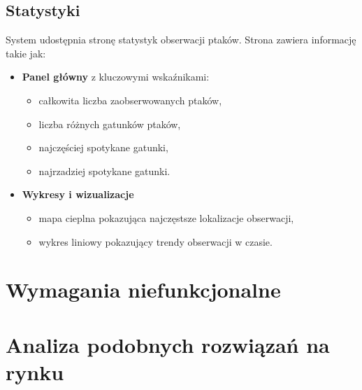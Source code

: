 \subsection{Statystyki}
System udostępnia stronę statystyk obserwacji ptaków. Strona zawiera informację takie jak:
\begin{itemize}
	\item \textbf{Panel główny} z kluczowymi wskaźnikami:
		\begin{itemize}
			\item całkowita liczba zaobserwowanych ptaków,
			\item liczba różnych gatunków ptaków,
			\item najczęściej spotykane gatunki,
			\item najrzadziej spotykane gatunki.
		\end{itemize}
	\item \textbf{Wykresy i wizualizacje}
		\begin{itemize}
			\item mapa cieplna pokazująca najczęstsze lokalizacje obserwacji,
			\item wykres liniowy pokazujący trendy obserwacji w czasie.
		\end{itemize}
\end{itemize}

\section{Wymagania niefunkcjonalne}

\section{Analiza podobnych rozwiązań na rynku}
